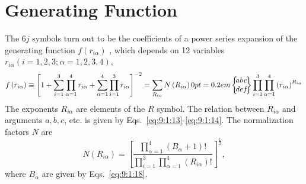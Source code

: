 \section{Generating Function}\label{sec:9.7}
The $6 j$ symbols turn out to be the coefficients of a power series expansion of the generating function $f\left(r_{i \alpha}\right)$ \cite{ref053}, which depends on 12 variables $r_{i \alpha}(i=1,2,3 ; \alpha=1,2,3,4)$,
\begin{equation}
f\left(r_{i \alpha}\right) \equiv\left[1+\sum_{i=1}^{3} \prod_{\alpha=1}^{4} r_{i \alpha}+\sum_{\alpha=1}^{4} \prod_{i=1}^{3} r_{i \alpha}\right]^{-2}=\sum_{R_{i \alpha}} N\left(R_{i \alpha}\right)\sixj{a}{b}{c}{d}{e}{f}  \label{eq:9:7:1} \prod_{i=1}^{3} \prod_{\alpha=1}^{4}\left(r_{i \alpha}\right)^{R_{i \alpha}}
\end{equation}
The exponents $R_{i \alpha}$ are elements of the $R$ symbol. The relation between $R_{i \alpha}$ and arguments $a, b, c$, etc. is given by Eqs.~\eqref{eq:9:1:13}-\eqref{eq:9:1:14}. The normalization factors $N$ are
\begin{equation}
N\left(R_{i \alpha}\right)=\left[\frac{\prod_{\alpha=1}^{4}\left(B_{\alpha}+1\right)!}{\prod_{i=1}^{3} \prod_{\alpha=1}^{4}\left(R_{i \alpha}\right)!}\right]^{\frac{1}{2}}, \label{eq:9:7:2}
\end{equation}
where $B_{\alpha}$ are given by Eqs.~\eqref{eq:9:1:18}.

